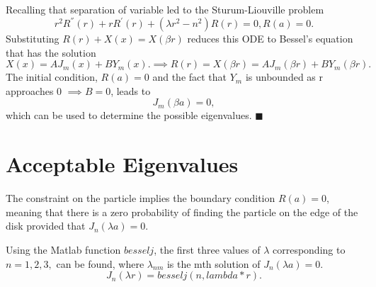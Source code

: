 \documentclass{article}
\begin{document}
Recalling that separation of variable led to the Sturum-Liouville problem
\begin{equation*}
    r^{2}R^{''}(r)+rR^{'}(r)+(\lambda r^2 -n^2)R(r)=0, R(a)=0.
\end{equation*}
Substituting $R(r)+X(x)=X(\beta r)$ reduces this ODE to Bessel's equation that has the solution
\begin{equation*}
	X(x)=AJ_m(x)+BY_m(x). \implies R(r)=X(\beta r) = AJ_m(\beta r)+ BY_m(\beta r).
\end{equation*}
The initial condition, $R(a)=0$ and the fact that $Y_m$ is unbounded as r approaches 0 $\implies B=0$, leads to
\begin{equation*}
	J_m(\beta a)=0,
\end{equation*}
which can be used to determine the possible eigenvalues. 
$\blacksquare$ 
\section{Acceptable Eigenvalues}

The constraint on the particle implies the boundary condition $R(a)=0$, meaning that there is a zero probability of finding the particle on the edge of the disk provided that $J_n(\lambda a)=0$.

Using the Matlab function $besselj$, the first three values of $\lambda$ corresponding to $n = 1,2,3,$ can be found, where $\lambda_{nm}$ is the mth solution of   $J_n(\lambda a)=0$. 
\begin{equation}
    J_{n}(\lambda r)= besselj(n, lambda*r).
\end{equation}
\end{document}
